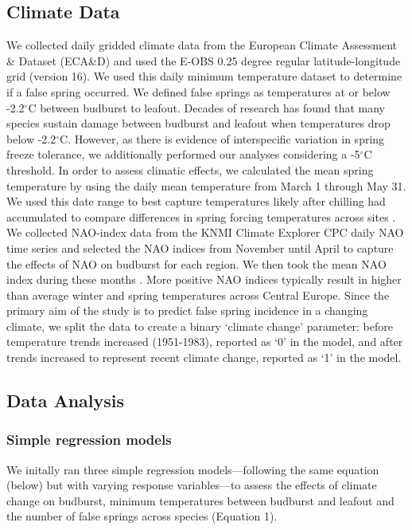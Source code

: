 \documentclass{article}\usepackage[]{graphicx}\usepackage[]{color}
\begin{document}
\subsection*{Climate Data} 
We collected daily gridded climate data from the European Climate Assessment \& Dataset (ECA\&D) and used the E-OBS 0.25 degree regular latitude-longitude grid (version 16). We used this daily minimum temperature dataset to determine if a false spring occurred. We defined false springs as temperatures at or below -2.2$^{\circ}$C \citep{Schwartz1993} between budburst to leafout. Decades of research has found that many species sustain damage between budburst and leafout when temperatures drop below -2.2$^{\circ}$C. However, as there is evidence of interspecific variation in spring freeze tolerance, we additionally performed our analyses considering a -5$^{\circ}$C \citep{Sakai1987,Lenz2013} threshold. In order to assess climatic effects, we calculated the mean spring temperature by using the daily mean temperature from March 1 through May 31. We used this date range to best capture temperatures likely after chilling had accumulated to compare differences in spring forcing temperatures across sites \citep{Basler2012, Korner2016}. We collected NAO-index data from the KNMI Climate Explorer CPC daily NAO time series and selected the NAO indices from November until April to capture the effects of NAO on budburst for each region. We then took the mean NAO index during these months \citep{NAOdata}. More positive NAO indices typically result in higher than average winter and spring temperatures across Central Europe. Since the primary aim of the study is to predict false spring incidence in a changing climate, we split the data to create a binary `climate change' parameter: before temperature trends increased (1951-1983), reported as `0' in the model, and after trends increased \citep[1984-2016,][]{Stocker2013,Kharouba2018} to represent recent climate change, reported as `1' in the model.

\subsection*{Data Analysis} 
\subsubsection*{Simple regression models}
We initally ran three simple regression models---following the same equation (below) but with varying response variables---to assess the effects of climate change on budburst, minimum temperatures between budburst and leafout and the number of false springs across species (Equation 1).
\end{document}
